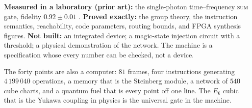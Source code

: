 \begin{boundary}
\textbf{Measured in a laboratory (prior art):} the single-photon time--frequency \textsc{sum}
gate, fidelity $0.92\pm0.01$ \cite{Imany2019}. \textbf{Proved exactly:} the group theory, the
instruction semantics, reachability, code parameters, routing bounds, and FPGA synthesis
figures. \textbf{Not built:} an integrated device; a magic-state injection circuit with a
threshold; a physical demonstration of the network. The machine is a specification whose
every number can be checked, not a device.
\end{boundary}

\begin{keyidea}
The forty points are also a computer: $81$ frames, four instructions generating
$4\,199\,040$ operations, a memory that is the Steinberg module, a network of $540$ cube
charts, and a quantum fuel that is every point off one line. The $E_6$ cubic that is the
Yukawa coupling in physics is the universal gate in the machine.
\end{keyidea}
